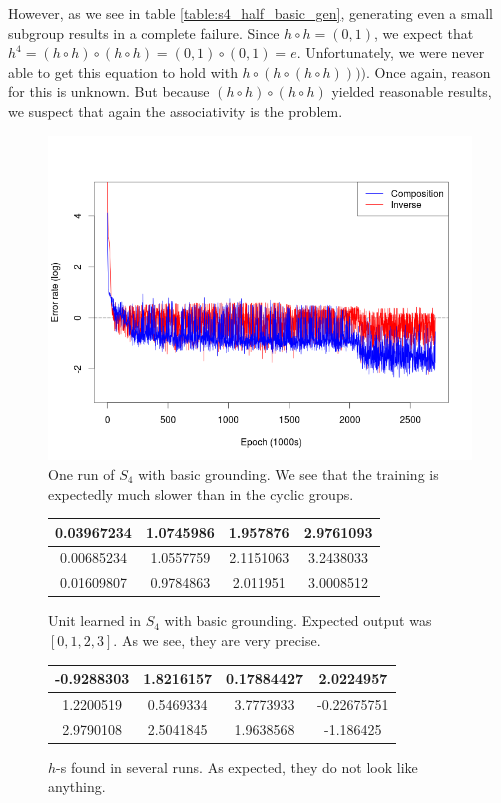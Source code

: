 However, as we see in table \ref{table:s4_half_basic_gen}, generating even a small subgroup results in a complete failure. Since $h\circ h=(0,1)$, we expect that $h^4=(h\circ h)\circ(h\circ h)=(0,1)\circ(0,1)=e$. Unfortunately, we were never able to get this equation to hold with $h\circ(h\circ(h\circ h))))$. Once again, reason for this is unknown. But because $(h\circ h)\circ (h\circ h)$ yielded reasonable results, we suspect that again the associativity is the problem.

\begin{figure}
\caption{One run of $S_4$ with basic grounding. We see that the training is expectedly much slower than in the cyclic groups.}
\label{graph:s4_basic}
\includegraphics[width=0.9\linewidth]{../img/s4_comp+inv.png}
\end{figure}

\begin{figure}
\center
\caption{Unit learned in $S_4$ with basic grounding. Expected output was $[0,1,2,3]$. As we see, they are very precise.}
\label{table:s4_unit_basic}
\begin{tabular}{cccc}
0.03967234 & 1.0745986 & 1.957876 & 2.9761093\\
\hline
0.00685234 & 1.0557759 & 2.1151063 & 3.2438033\\
\hline
0.01609807 & 0.9784863 & 2.011951 & 3.0008512\\
\end{tabular}
\end{figure}

\begin{figure}
\center
\caption{$h$-s found in several runs. As expected, they do not look like anything.}
\label{table:s4_half_basic}
\begin{tabular}{cccc}
-0.9288303 & 1.8216157 & 0.17884427 & 2.0224957\\
\hline
1.2200519 & 0.5469334 & 3.7773933 & -0.22675751\\
 \hline
2.9790108 & 2.5041845 & 1.9638568 & -1.186425\\
\hline
\end{tabular}
\end{figure}

